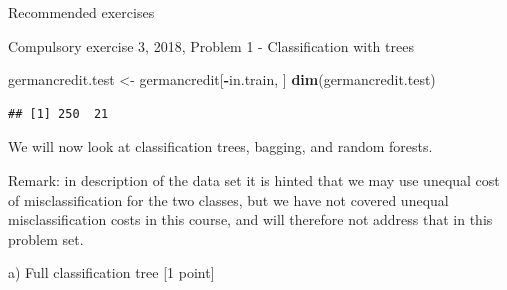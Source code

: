 \documentclass[10pt,ignorenonframetext,]{beamer}
\newenvironment{Shaded}{\begin{snugshade}}{\end{snugshade}}
\newcommand{\KeywordTok}[1]{\textcolor[rgb]{0.13,0.29,0.53}{\textbf{#1}}}
\newcommand{\DataTypeTok}[1]{\textcolor[rgb]{0.13,0.29,0.53}{#1}}
\newcommand{\DecValTok}[1]{\textcolor[rgb]{0.00,0.00,0.81}{#1}}
\newcommand{\StringTok}[1]{\textcolor[rgb]{0.31,0.60,0.02}{#1}}
\newcommand{\CommentTok}[1]{\textcolor[rgb]{0.56,0.35,0.01}{\textit{#1}}}
\newcommand{\OperatorTok}[1]{\textcolor[rgb]{0.81,0.36,0.00}{\textbf{#1}}}
\newcommand{\NormalTok}[1]{#1}
\begin{document}
\begin{frame}[fragile]{Recommended exercises}
\begin{block}{Compulsory exercise 3, 2018, Problem 1 - Classification
with trees}
\begin{Shaded}
\begin{Highlighting}[]
\NormalTok{germancredit.test <-}\StringTok{ }\NormalTok{germancredit[}\OperatorTok{-}\NormalTok{in.train, ]}
\KeywordTok{dim}\NormalTok{(germancredit.test)}
\end{Highlighting}
\end{Shaded}

\begin{verbatim}
## [1] 250  21
\end{verbatim}

We will now look at classification trees, bagging, and random forests.

Remark: in description of the data set it is hinted that we may use
unequal cost of misclassification for the two classes, but we have not
covered unequal misclassification costs in this course, and will
therefore not address that in this problem set.

\begin{block}{a) Full classification tree {[}1 point{]}}

\begin{Shaded}
\end{Shaded}


\end{block}
\end{block}
\end{frame}
\end{document}
